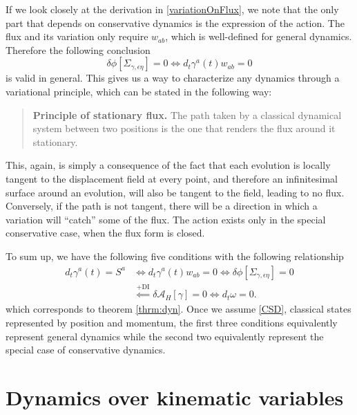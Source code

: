 \documentclass[12pt]{article}
\begin{document}
If we look closely at the derivation in \ref{variationOnFlux}, we note that the only part that depends on conservative dynamics is the expression of the action. The flux and its variation only require $w_{ab}$, which is well-defined for general dynamics. Therefore the following conclusion
\begin{equation}
	\delta \phi[\Sigma_{\gamma, \epsilon \eta}]=0 \iff d_t \gamma^a(t) w_{ab} = 0
\end{equation}
is valid in general. This gives us a way to characterize any dynamics through a variational principle, which can be stated in the following way:
\begin{quote}
	\textbf{Principle of stationary flux.} The path taken by a classical dynamical system between two positions is the one that renders the flux around it stationary.
\end{quote}
This, again, is simply a consequence of the fact that each evolution is locally tangent to the displacement field at every point, and therefore an infinitesimal surface around an evolution, will also be tangent to the field, leading to no flux. Conversely, if the path is not tangent, there will be a direction in which a variation will ``catch'' some of the flux. The action exists only in the special conservative case, when the flux form is closed.

To sum up, we have the following five conditions with the following relationship
\begin{equation}
\begin{aligned}
    d_t \gamma^a(t) = S^a &\iff d_t \gamma^a(t) w_{ab}=0 \iff \delta \phi[\Sigma_{\gamma, \epsilon \eta}]=0 \\&\stackrel{\text{+DI}}{\impliedby} \delta \mathcal{A}_H[\gamma] = 0 \iff d_t \omega =0.
\end{aligned}
\end{equation}
which corresponds to theorem \ref{thrm:dyn}. Once we assume \ref{CSD}, classical states represented by position and momentum, the first three conditions equivalently represent general dynamics while the second two equivalently represent the special case of conservative dynamics.

\section{Dynamics over kinematic variables}
\end{document}
